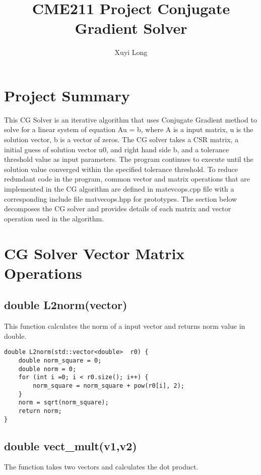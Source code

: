 \documentclass{article}
\title{CME211 Project Conjugate Gradient Solver}
\author{Xuyi Long}
\begin{document}
\maketitle


\section{Project Summary}

This CG Solver is an iterative algorithm that uses Conjugate Gradient method to solve for a linear system of equation Au = b, where A is a input matrix, u is the solution vector, b is a vector of zeros. The CG solver takes a CSR matrix, a initial guess of solution vector u0, and right hand side b, and a tolerance threshold value as input parameters. The program continues to execute until the solution value converged within the specified tolerance threshold. To reduce redundant code in the program, common vector and matrix operations that are implemented in the CG algorithm are defined in matevcops.cpp file with a corresponding include file matvecops.hpp for prototypes. The section below decomposes the CG solver and provides details of each matrix and vector operation used in the algorithm.



\section{CG Solver Vector Matrix Operations}

\subsection{double L2norm(vector)}

 This function calculates the norm of a input vector and returns norm value in double.

 \begin{verbatim}
double L2norm(std::vector<double>  r0) {
    double norm_square = 0;
    double norm = 0;
    for (int i =0; i < r0.size(); i++) {
        norm_square = norm_square + pow(r0[i], 2);
    }
    norm = sqrt(norm_square);
    return norm;
}
\end{verbatim}

\subsection{double vect\_mult(v1,v2)}

The function takes two vectors and calculates the dot product.
\end{document}
